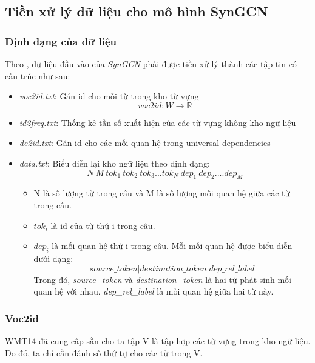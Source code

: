 \subsection{Tiền xử lý dữ liệu cho mô hình SynGCN}

\subsubsection{Định dạng của dữ liệu}

Theo \cite{github.wordgcn}, dữ liệu đầu vào của \textit{SynGCN} phải được tiền xử lý thành các tập tin có cấu trúc như sau:
\begin{itemize}
	\item \textit{voc2id.txt}: Gán id cho mỗi từ trong kho từ vựng
	\begin{equation*}
		voc2id: W \rightarrow \mathbb{R}
	\end{equation*}
	\item \textit{id2freq.txt}: Thống kê tần số xuất hiện của các từ vựng không kho ngữ liệu
	\item \textit{de2id.txt}: Gán id cho các mối quan hệ trong universal dependencies
	\item \textit{data.txt}: Biểu diễn lại kho ngữ liệu theo định dạng:
	\begin{equation*}
	N\ M\ tok_1\ tok_2\ tok_3 ... tok_N\ dep_1\ dep_2 .... dep_M
	\end{equation*}
	\begin{itemize}
		\item N là số lượng từ trong câu và M là số lượng mối quan hệ giữa các từ trong câu.
		\item $tok_i$ là id của từ thứ i trong câu.
		\item $dep_i$ là mối quan hệ thứ i trong câu. Mỗi mối quan hệ được biểu diễn dưới dạng:
		\begin{equation*}
			source\_token|destination\_token|dep\_rel\_label
		\end{equation*}
		Trong đó, \textit{source\_token} và \textit{destination\_token} là hai từ phát sinh mối quan hệ với nhau. \textit{dep\_rel\_label} là mối quan hệ giữa hai từ này.
	\end{itemize}
\end{itemize}

\subsubsection{Voc2id}

WMT14 đã cung cấp sẵn cho ta tập V là tập hợp các từ vựng trong kho ngữ liệu. Do đó, ta chỉ cần đánh số thứ tự cho các từ trong V.

